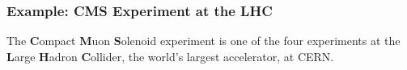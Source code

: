 \documentclass[10pt,t]{beamer}
\begin{document}
\begin{frame}
\frametitle{Example: CMS Experiment at the LHC}
\vspace*{-2.5\baselineskip}
The \textbf{C}ompact \textbf{M}uon \textbf{S}olenoid experiment is one of the four experiments at the \textbf{L}arge \textbf{H}adron \textbf{C}ollider, the world's largest accelerator, at CERN. \\[\baselineskip]
\vspace*{-18pt}
\end{frame}
\end{document}
